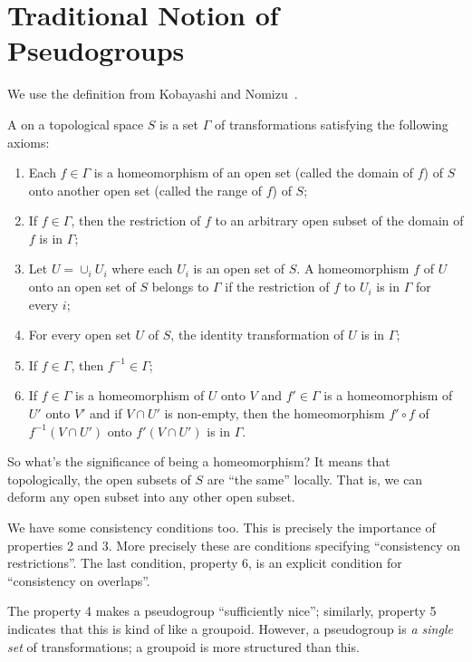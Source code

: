 
\section{Traditional Notion of Pseudogroups}

We use the definition from Kobayashi and Nomizu~\cite{kobayashi1963foundations}.

\begin{defn}
A  on a topological space
$S$ is a set $\Gamma$ of transformations satisfying the following
axioms:
\begin{enumerate}
\item Each $f\in\Gamma$ is a homeomorphism of an open set (called
  the domain of $f$) of $S$ onto another open set (called the
  range of $f$) of $S$;
\item If $f\in\Gamma$, then the restriction of $f$ to an
  arbitrary open subset of the domain of $f$ is in $\Gamma$;
\item Let $U=\cup_{i}U_{i}$ where each $U_{i}$ is an open set of
  $S$. A homeomorphism $f$ of $U$ onto an open set of $S$ belongs
  to $\Gamma$ if the restriction of $f$ to $U_{i}$ is in $\Gamma$
  for every $i$;
\item For every open set $U$ of $S$, the identity transformation
  of $U$ is in $\Gamma$;
\item If $f\in\Gamma$, then $f^{-1}\in\Gamma$;
\item If $f\in\Gamma$ is a homeomorphism of $U$ onto $V$ and
  $f'\in\Gamma$ is a homeomorphism of $U'$ onto $V'$ and if
  $V\cap U'$ is non-empty, then the homeomorphism $f'\circ f$ of
  $f^{-1}(V\cap U')$ onto $f'(V\cap U')$ is in $\Gamma$.
\end{enumerate}
\end{defn}

So what's the significance of being a homeomorphism? It means
that topologically, the open subsets of $S$ are ``the same''
locally. That is, we can deform any open subset into any other
open subset.

We have some consistency conditions too. This is precisely the
importance of properties 2 and 3. More precisely these are
conditions specifying ``consistency on restrictions''. The last
condition, property 6, is an explicit condition for ``consistency
on overlaps''. 

The property 4 makes a pseudogroup ``sufficiently nice'';
similarly, property 5 indicates that this is kind of like a
groupoid. However, a pseudogroup is \emph{a single set} of
transformations; a groupoid is more structured than this.
